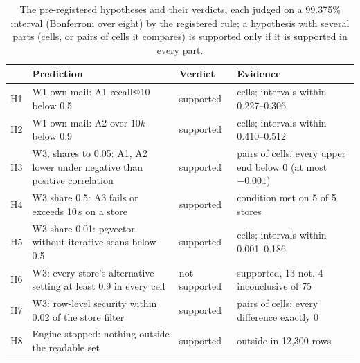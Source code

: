 \begin{table}[t]
\caption{The pre-registered hypotheses and their verdicts, each judged on a 99.375\% interval (Bonferroni over eight) by the registered rule; a hypothesis with several parts (cells, or pairs of cells it compares) is supported only if it is supported in every part.}
\label{tab:hypotheses}
\footnotesize\setlength{\tabcolsep}{4pt}
\begin{tabularx}{\columnwidth}{@{}l>{\raggedright\arraybackslash}X>{\raggedright\arraybackslash}p{1.3cm}>{\raggedright\arraybackslash}p{2.6cm}@{}}
\toprule
& Prediction & Verdict & Evidence \\
\midrule
H1 & W1 own mail: A1 recall@10 below 0.5 & supported & 10 cells; intervals within 0.227--0.306 \\
H2 & W1 own mail: A2 over $10k$ below 0.9 & supported & 10 cells; intervals within 0.410--0.512 \\
H3 & W3, shares to 0.05: A1, A2 lower under negative than positive correlation & supported & 90 pairs of cells; every upper end below 0 (at most $-0.001$) \\
H4 & W3 share 0.5: A3 fails or exceeds 10\,s on a store & supported & condition met on 5 of 5 stores \\
H5 & W3 share 0.01: pgvector without iterative scans below 0.5 & supported & 3 cells; intervals within 0.001--0.186 \\
H6 & W3: every store's alternative setting at least 0.9 in every cell & not supported & 58 supported, 13 not, 4 inconclusive of 75 \\
H7 & W3: row-level security within 0.02 of the store filter & supported & 30 pairs of cells; every difference exactly 0 \\
H8 & Engine stopped: nothing outside the readable set & supported & 0 outside in 12{,}300 rows \\
\bottomrule
\end{tabularx}
\end{table}
